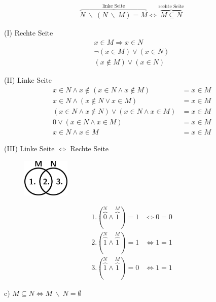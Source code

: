 \begin{align*}
\overbrace{N \ \backslash \ (N \ \backslash \ M) = M}^{\text{linke Seite}} \Leftrightarrow \overbrace{M \subseteq N}^{\text{rechte Seite}}
\end{align*}

(I) Rechte Seite
\begin{align*}
x \in M \Rightarrow x \in N\\
\lnot(x \in M) \lor (x \in N)\\
(x \not \in M) \lor (x \in N)
\end{align*}

(II) Linke Seite
\begin{align*}
x \in N \land x \not \in (x \in N \land x \not \in M) &= x \in M\\
x \in N \land (x \not \in N \lor x \in M) &= x \in M\\
(x \in N \land x \not \in N) \lor (x \in N \land x \in M) &= x \in M\\
0 \lor (x \in N \land x \in M) &= x \in M\\
x \in N \land x \in M &= x \in M
\end{align*}

(III) Linke Seite $\Leftrightarrow$ Rechte Seite

\begin{figure}[h]
\centering
\includegraphics[width=0.2\textwidth]{graphics/proof.png}
\end{figure}

\begin{align*}
1. (\overbrace{0}^{N} \land \overbrace{1}^{M}) = 1 &\Leftrightarrow 0 = 0\\
2. (\overbrace{1}^{N} \land \overbrace{1}^{M}) = 1 &\Leftrightarrow 1 = 1\\
3. (\overbrace{1}^{N} \land \overbrace{1}^{M}) = 0 &\Leftrightarrow 1 = 1
\end{align*}

c) $M \subseteq N \Leftrightarrow M \ \backslash \ N = \emptyset$

\newpage